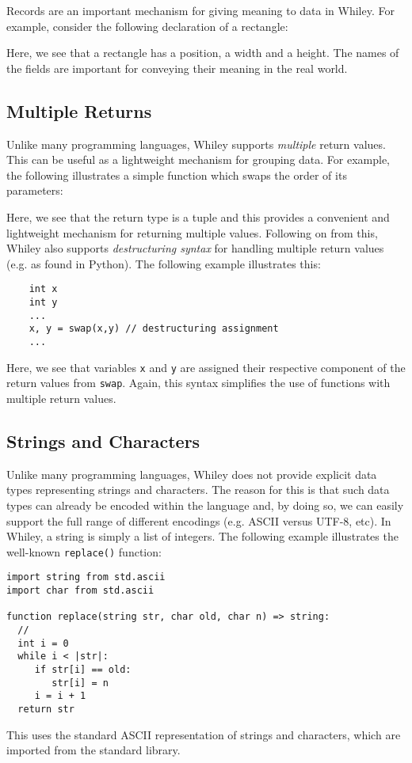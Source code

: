 Records are an important mechanism for giving meaning to data in Whiley.  For example, consider the following declaration of a rectangle:



Here, we see that a rectangle has a position, a width and a height.  The names of the fields are important for conveying their meaning in the real world.

\subsection{Multiple Returns}

Unlike many programming languages, Whiley supports {\em multiple} return values.  This can be useful as a lightweight mechanism for grouping data.  For example, the following illustrates a simple function which swaps the order of its parameters:



Here, we see that the return type is a tuple and this provides a convenient and lightweight mechanism for returning multiple values.  Following on from this, Whiley also supports {\em destructuring syntax} for handling multiple return values (e.g. as found in Python).  The following example illustrates this:

\begin{lstlisting}
    int x
    int y
    ...
    x, y = swap(x,y) // destructuring assignment
    ...        
\end{lstlisting}

Here, we see that variables \lstinline{x} and \lstinline{y} are assigned their respective component of the return values from \lstinline{swap}.  Again, this syntax simplifies the use of functions with multiple return values.

\subsection{Strings and Characters}

Unlike many programming languages, Whiley does not provide explicit data types representing strings and characters.  The reason for this is that such data types can already be encoded within the language and, by doing so, we can easily support the full range of different encodings (e.g. ASCII versus UTF-8, etc).  In Whiley, a string is simply a list of integers.  The following example illustrates the well-known \lstinline{replace()} function:

\begin{lstlisting}
import string from std.ascii
import char from std.ascii

function replace(string str, char old, char n) => string:
  //
  int i = 0
  while i < |str|:
     if str[i] == old:
        str[i] = n
     i = i + 1
  return str
\end{lstlisting}

This uses the standard ASCII representation of strings and characters, which are imported from the standard library.  